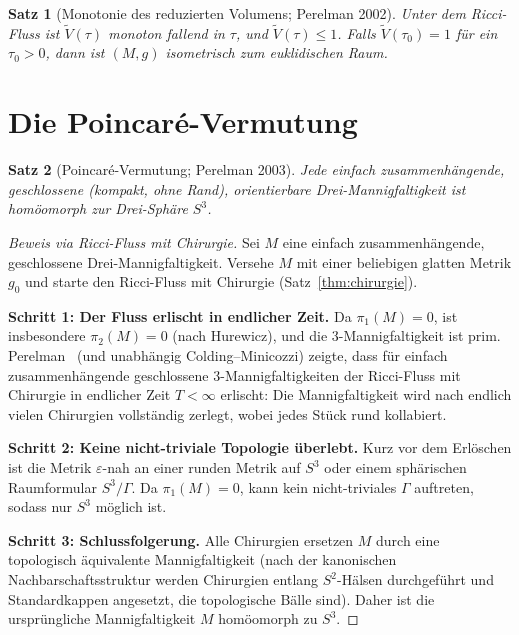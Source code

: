 \documentclass[12pt,a4paper]{amsart}
\newtheorem{theorem}{Satz}[section]
\theoremstyle{definition}
\theoremstyle{remark}
\begin{document}
\begin{theorem}[Monotonie des reduzierten Volumens; Perelman 2002]
Unter dem Ricci-Fluss ist $\tilde V(\tau)$ monoton fallend in $\tau$,
und $\tilde V(\tau) \leq 1$.  Falls $\tilde V(\tau_0) = 1$ für ein
$\tau_0 > 0$, dann ist $(M,g)$ isometrisch zum euklidischen Raum.
\end{theorem}


\section{Die Poincaré-Vermutung}
\label{sec:poincare}

\begin{theorem}[Poincaré-Vermutung; Perelman 2003]
\label{thm:poincare}
Jede einfach zusammenhängende, geschlossene (kompakt, ohne Rand),
orientierbare Drei-Mannigfaltigkeit ist homöomorph zur Drei-Sphäre $S^3$.
\end{theorem}

\begin{proof}[Beweis via Ricci-Fluss mit Chirurgie]
Sei $M$ eine einfach zusammenhängende, geschlossene Drei-Mannigfaltigkeit.
Versehe $M$ mit einer beliebigen glatten Metrik $g_0$ und starte den
Ricci-Fluss mit Chirurgie (Satz~\ref{thm:chirurgie}).

\medskip
\textbf{Schritt 1: Der Fluss erlischt in endlicher Zeit.}
Da $\pi_1(M) = 0$, ist insbesondere $\pi_2(M) = 0$ (nach Hurewicz), und die
$3$-Mannigfaltigkeit ist prim.  Perelman~\cite{Perelman2003b} (und unabhängig
Colding--Minicozzi) zeigte, dass für einfach zusammenhängende geschlossene
$3$-Mannigfaltigkeiten der Ricci-Fluss mit Chirurgie in endlicher Zeit
$T < \infty$ erlischt: Die Mannigfaltigkeit wird nach endlich vielen
Chirurgien vollständig zerlegt, wobei jedes Stück rund kollabiert.

\medskip
\textbf{Schritt 2: Keine nicht-triviale Topologie überlebt.}
Kurz vor dem Erlöschen ist die Metrik $\varepsilon$-nah an einer runden
Metrik auf $S^3$ oder einem sphärischen Raumformular $S^3/\Gamma$.
Da $\pi_1(M) = 0$, kann kein nicht-triviales $\Gamma$ auftreten, sodass
nur $S^3$ möglich ist.

\medskip
\textbf{Schritt 3: Schlussfolgerung.}
Alle Chirurgien ersetzen $M$ durch eine topologisch äquivalente Mannigfaltigkeit
(nach der kanonischen Nachbarschaftsstruktur werden Chirurgien entlang
$S^2$-Hälsen durchgeführt und Standardkappen angesetzt, die topologische
Bälle sind).  Daher ist die ursprüngliche Mannigfaltigkeit $M$ homöomorph
zu $S^3$.
\end{proof}
\end{document}
